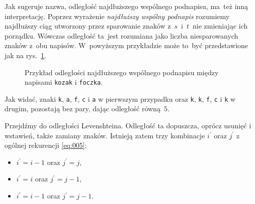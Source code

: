 \documentclass{praca1}
\begin{document}
Jak sugeruje nazwa, odległość najdłuższego wspólnego podnapisu, ma~też inną interpretację. Poprzez wyrażenie \emph{najdłuższy wspólny podnapis} rozumiemy najdłuższy ciąg utworzony przez sparowanie znaków z~$s$~i~$t$~nie zmieniając ich porządku. Wówczas odległość ta~jest rozumiana jako liczba niesparowanych znaków z~obu napisów. W~powyższym przykładzie może to~być przedstawione jak na rys.~\ref{rys:003}.
	
	

\begin{figure}[width=80pt]
\centering
{}
\cprotect\caption{Przykład odległości najdłuższego wspólnego podnapisu między napisami \verb|kozak| i \verb|foczka|.}\label{rys:003}
\end{figure}

Jak widać, znaki \verb|k|, \verb|a|, \verb|f|, \verb|c| i \verb|a| w pierwszym przypadku oraz \verb|k|, \verb|k|, \verb|f|, \verb|c| i \verb|k| w drugim, pozostają bez pary, dając odległość równą~$5$.





Przejdźmy do odległości Levenshteina. Odległość ta dopuszcza, oprócz usunięć i wstawień, także zamiany znaków. Istnieją zatem  trzy kombinacje $i^\prime$ oraz $j^\prime$ z ogólnej rekurencji \eqref{eq:005}:
\begin{itemize}
\item $i^\prime = i - 1$ oraz $j^\prime = j$,
\item $i^\prime = i$ oraz $j^\prime = j - 1$,
\item $i^\prime = i - 1$ oraz $j^\prime = j - 1$.
\end{itemize}
\end{document}
